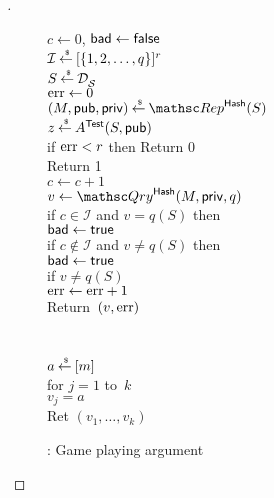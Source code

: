 \begin{proof}[]
\begin{figure}
{{$c\gets 0$, $\mathsf{bad} \gets \mathsf{false}$\\
$\mathcal{I}{\:\stackrel{{\scriptscriptstyle \hspace{0.2em}\$}} {\leftarrow}\:} [\{1,2,\ldots,q\}]^r$\\
$S {\:\stackrel{{\scriptscriptstyle \hspace{0.2em}\$}} {\leftarrow}\:} \mathcal{D}_{{\cal S}}^{}$\\
$\mathrm{err} \gets 0$\\
$(M,\pubaux,\privaux) \getsr \Rep^{\HashOracle}(S)$\\
$z {\:\stackrel{{\scriptscriptstyle \hspace{0.2em}\$}} {\leftarrow}\:} A^{\mathsf{Test}}(S,{\sf pub})$\\
if $\mathrm{err}  < r$ then Return 0\\
Return 1
}
%
{
\\
$c \gets c+1$\\
$v \gets \Qry^{\HashOracle}(M,\privaux,q)$\\
if $c \in \mathcal{I}$ and $v = q(S)$ then \\
\nudge $\mathsf{bad} \gets \mathsf{true}$ \\
if $c \not\in \mathcal{I}$ and $v \neq q(S)$ then \\
\nudge $\mathsf{bad} \gets \mathsf{true}$\\
if $v \neq q(S)$\\
\nudge $\mathrm{err} \gets\mathrm{err} +1$\\
Return~$(v,\mathrm{err} )$\\\\
%
\\
$a {\:\stackrel{{\scriptscriptstyle \hspace{0.2em}\$}} {\leftarrow}\:} [m]$\\
for $j = 1$ to~$k$\\
\nudge $v_j = a$\\
Ret $\left(v_1,\ldots,v_k\right)$
}
}
\caption{: Game playing argument}\label{fig:2TGame}
\end{figure}


\end{proof}

